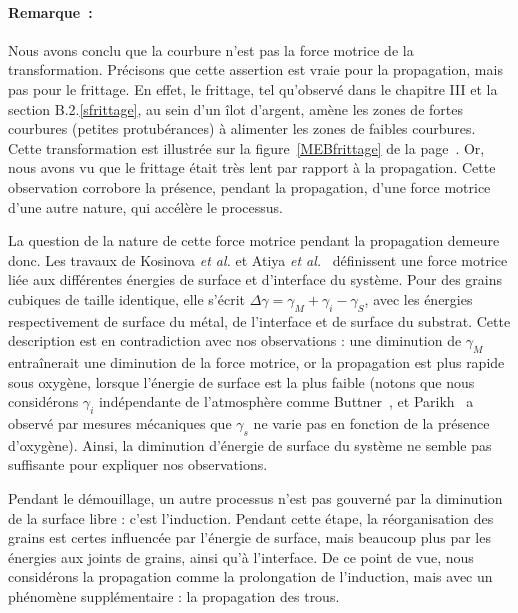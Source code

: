 \paragraph*{Remarque~:} Nous avons conclu que la courbure n’est pas la force motrice de la transformation. Précisons que cette assertion est vraie pour la propagation, mais pas pour le frittage. En effet, le frittage, tel qu’observé dans le chapitre III et la section B.2.\ref{sfrittage}, au sein d’un îlot d’argent, amène les zones de fortes courbures (petites protubérances) à alimenter les zones de faibles courbures. Cette transformation est illustrée sur la figure~\ref{MEBfrittage} de la page~\pageref{MEBfrittage}. Or, nous avons vu que le frittage était très lent par rapport à la propagation. Cette observation corrobore la présence, pendant la propagation, d’une force motrice d’une autre nature, qui accélère le processus.\par \vspace{12pt}

La question de la nature de cette force motrice pendant la propagation demeure donc. Les travaux de Kosinova \textit{et al.} et Atiya \textit{et al.}~\cite{kosinova2014role, atiya2014role} définissent une force motrice liée aux différentes énergies de surface et d'interface du système. Pour des grains cubiques de taille identique, elle s’écrit $\Delta\gamma = \gamma_M+\gamma_i-\gamma_S$, avec les énergies respectivement de surface du métal, de l’interface et de surface du substrat. Cette description est en contradiction avec nos observations : une diminution de $\gamma_M$ entraînerait une diminution de la force motrice, or la propagation est plus rapide sous oxygène, lorsque l’énergie de surface est la plus faible (notons que nous considérons $\gamma_i$ indépendante de l’atmosphère comme Buttner~\cite{buttner1952adsorption}, et Parikh~\cite{parikh1958effect} a observé par mesures mécaniques que $\gamma_s$ ne varie pas en fonction de la présence d’oxygène). Ainsi, la diminution d’énergie de surface du système ne semble pas suffisante pour expliquer nos observations.\par 
Pendant le démouillage, un autre processus n’est pas gouverné par la diminution de la surface libre : c’est l’induction. Pendant cette étape, la réorganisation des grains est certes influencée par l’énergie de surface, mais beaucoup plus par les énergies aux joints de grains, ainsi qu’à l’interface. De ce point de vue, nous considérons la propagation comme la prolongation de l’induction, mais avec un phénomène supplémentaire : la propagation des trous.\par 
{}


